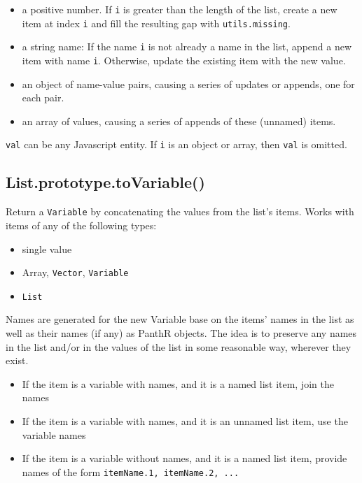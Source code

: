 \documentclass{article}
\begin{document}
\begin{itemize}

\item a positive number. If \texttt{i} is greater than the length of the list,
create a new item at index \texttt{i} and fill the resulting gap with \texttt{utils.missing}.

\item a string name:  If the name \texttt{i} is not already a name in the list, append a
new item with name \texttt{i}. Otherwise, update the existing item with the new value.

\item an object of name-value pairs, causing a series of updates or appends, one for
each pair.

\item an array of values, causing a series of appends of these (unnamed) items.

\end{itemize}

\texttt{val} can be any Javascript entity. If \texttt{i} is an object or array, then \texttt{val} is
omitted.


    \subsection*{List.prototype.toVariable()}
    Return a \texttt{Variable} by concatenating the values from the list's items.
Works with items of any of the following types:


\begin{itemize}

\item single value

\item Array, \texttt{Vector}, \texttt{Variable}

\item \texttt{List}

\end{itemize}

Names are generated for the new Variable base on the items' names in the list
as well as their names (if any) as PanthR objects. The idea is to preserve any
names in the list and/or in the values of the list in some reasonable way,
wherever they exist.


\begin{itemize}

\item If the item is a variable with names, and it is a named list item, join the names

\item If the item is a variable with names, and it is an unnamed list item,
use the variable names

\item If the item is a variable without names, and it is a named list item, provide
names of the form \texttt{itemName.1, itemName.2, ...}

\end{itemize}
\end{document}
